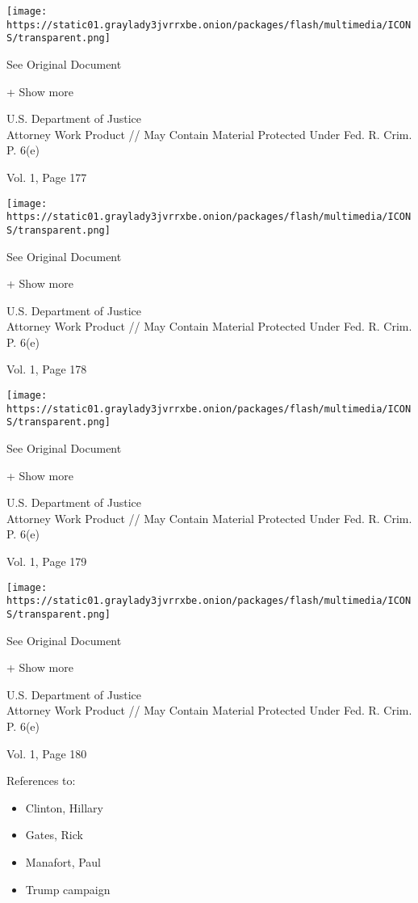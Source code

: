 \protect\hyperlink{}{}

\texttt{[image: https://static01.graylady3jvrrxbe.onion/packages/flash/multimedia/ICONS/transparent.png]}

See Original Document

+ Show more

U.S. Department of Justice\\
Attorney Work Product // May Contain Material Protected Under Fed. R.
Crim. P. 6(e)

Vol. 1, Page 177

\protect\hyperlink{}{}

\texttt{[image: https://static01.graylady3jvrrxbe.onion/packages/flash/multimedia/ICONS/transparent.png]}

See Original Document

+ Show more

U.S. Department of Justice\\
Attorney Work Product // May Contain Material Protected Under Fed. R.
Crim. P. 6(e)

Vol. 1, Page 178

\protect\hyperlink{}{}

\texttt{[image: https://static01.graylady3jvrrxbe.onion/packages/flash/multimedia/ICONS/transparent.png]}

See Original Document

+ Show more

U.S. Department of Justice\\
Attorney Work Product // May Contain Material Protected Under Fed. R.
Crim. P. 6(e)

Vol. 1, Page 179

\protect\hyperlink{}{}

\texttt{[image: https://static01.graylady3jvrrxbe.onion/packages/flash/multimedia/ICONS/transparent.png]}

See Original Document

+ Show more

U.S. Department of Justice\\
Attorney Work Product // May Contain Material Protected Under Fed. R.
Crim. P. 6(e)

Vol. 1, Page 180

References to:

\begin{itemize}
\tightlist
\item
  Clinton, Hillary
\item
  Gates, Rick
\item
  Manafort, Paul 
\item
  Trump campaign
\end{itemize}

